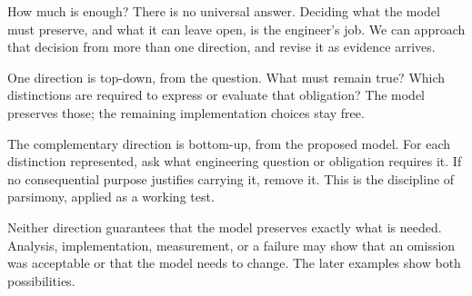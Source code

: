 
How much is enough? There is no universal answer. Deciding what the model must preserve, and what it can leave open, is the engineer’s job. We can approach that decision from more than one direction, and revise it as evidence arrives.


One direction is top-down, from the question. What must remain true? Which distinctions are required to express or evaluate that obligation? The model preserves those; the remaining implementation choices stay free.


The complementary direction is bottom-up, from the proposed model. For each distinction represented, ask what engineering question or obligation requires it. If no consequential purpose justifies carrying it, remove it. This is the discipline of parsimony, applied as a working test.


Neither direction guarantees that the model preserves exactly what is needed. Analysis, implementation, measurement, or a failure may show that an omission was acceptable or that the model needs to change. The later examples show both possibilities.

